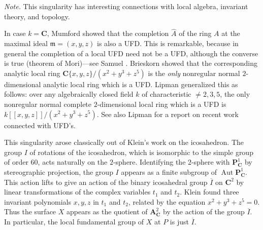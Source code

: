 {\noindent\hspace*{1.2em}\emph{Note.} This singularity has interesting connections with local algebra, invariant theory, and topology.

In case $k=\mathbf C$, Mumford  showed that the completion $\widehat A$ of the ring $A$ at the maximal ideal $\mathfrak m=(x,y,z)$ is also a UFD. This is remarkable, because in general the completion of a local UFD need not be a UFD, although the converse is true (theorem of Mori)---see Samuel . Brieskorn  showed that the corresponding analytic local ring $\mathbf C\{x,y,z\}/(x^2+y^3+z^5)$ is the \emph{only} nonregular normal $2$-dimensional analytic local ring which is a UFD. Lipman  generalized this as follows: over any algebraically closed field $k$ of characteristic $\ne2,3,5$, the only nonregular normal complete $2$-dimensional local ring which is a UFD is $k[\![x,y,z]\!]/(x^2+y^3+z^5)$. See also Lipman  for a report on recent work connected with UFD's.

This singularity arose classically out of Klein's work on the icosahedron. The group $I$ of rotations of the icosahedron, which is isomorphic to the simple group of order $60$, acts naturally on the $2$-sphere. Identifying the $2$-sphere with $\mathbf P^1_{\mathbf C}$ by stereographic projection, the group $I$ appears as a finite subgroup of $\operatorname{Aut}\mathbf P^1_{\mathbf C}$. This action lifts to give an action of the binary icosahedral group $\overline I$ on $\mathbf C^2$ by linear transformations of the complex variables $t_1$ and $t_2$. Klein  found three invariant polynomials $x,y,z$ in $t_1$ and $t_2$, related by the equation $x^2+y^3+z^5=0$. Thus the surface $X$ appears as the quotient of $\mathbf A^2_{\mathbf C}$ by the action of the group $\overline I$. In particular, the local fundamental group of $X$ at $P$ is just $\overline I$.}
